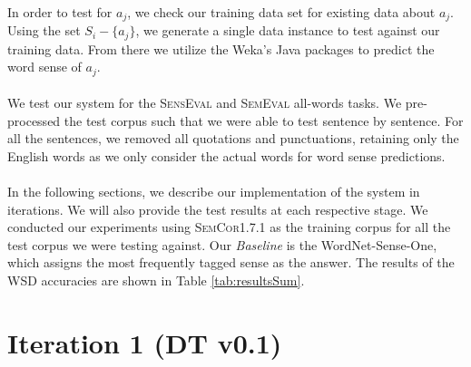 
\paragraph{}
In order to test for $a_{j}$, we check our training data set for existing data about $a_{j}$. Using the set $S_{i} - \{a_{j}\}$, we generate a single data instance to test against our training data. From there we utilize the Weka's Java packages to predict the word sense of $a_{j}$.

\paragraph{}
We test our system for the \textsc{SensEval} and \textsc{SemEval} all-words tasks. We pre-processed the test corpus such that we were able to test sentence by sentence. For all the sentences, we removed all quotations and punctuations, retaining only the English words as we only consider the actual words for word sense predictions.

\paragraph{}
In the following sections, we describe our implementation of the system in iterations. We will also provide the test results at each respective stage. We conducted our experiments using \textsc{SemCor1.7.1} as the training corpus for all the test corpus we were testing against. Our \textit{Baseline} is the WordNet-Sense-One, which assigns the most frequently tagged sense as the answer. The results of the WSD accuracies are shown in Table \ref{tab:resultsSum}.

\section{Iteration 1 (DT v0.1)}
\label{it:1}
